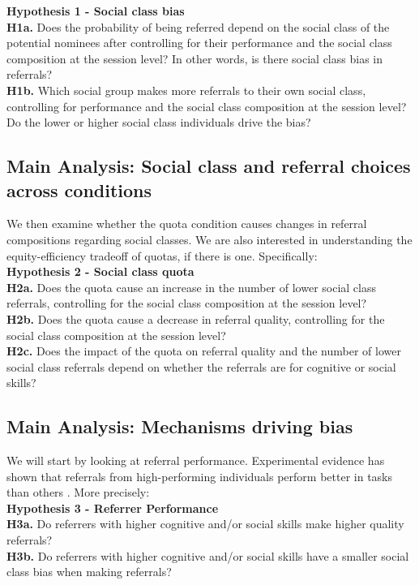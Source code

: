 \documentclass[11pt,a4paper,oneside]{article}
\begin{document}
\noindent\textbf{Hypothesis 1 - Social class bias}\\
\noindent\textbf{H1a.} Does the probability of being referred depend on the social class of the potential nominees after controlling for their performance and the social class composition at the session level? In other words, is there social class bias in referrals?\\
\noindent\textbf{H1b.} Which social group makes more referrals to their own social class, controlling for performance and the social class composition at the session level? Do the lower or higher social class individuals drive the bias?

\subsection{Main Analysis: Social class and referral choices across conditions}
We then examine whether the quota condition causes changes in referral compositions regarding social classes. We are also interested in understanding the equity-efficiency tradeoff of quotas, if there is one. Specifically:\\

\noindent\textbf{Hypothesis 2 - Social class quota}\\
\noindent\textbf{H2a.} Does the quota cause an increase in the number of lower social class referrals, controlling for the social class composition at the session level?  \\
\noindent\textbf{H2b.} Does the quota cause a decrease in referral quality, controlling for the social class composition at the session level? \\
\noindent\textbf{H2c.} Does the impact of the quota on referral quality and the number of lower social class referrals depend on whether the referrals are for cognitive or social skills?

\subsection{Main Analysis: Mechanisms driving bias}
We will start by looking at referral performance. Experimental evidence has shown that referrals from high-performing individuals perform better in tasks than others \citep{beaman_who_2012, beaman_job_2018,pallais_why_2016}. More precisely:\\

\noindent\textbf{Hypothesis 3 - Referrer Performance}\\
\noindent\textbf{H3a.} Do referrers with higher cognitive and/or social skills make higher quality referrals?  \\
\noindent\textbf{H3b.} Do referrers with higher cognitive and/or social skills have a smaller social class bias when making referrals?
\end{document}

